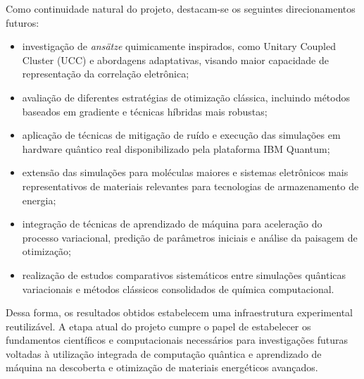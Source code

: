 Como continuidade natural do projeto, destacam-se os seguintes 
direcionamentos futuros:

\begin{itemize}
    \item investigação de \textit{ansätze} quimicamente inspirados, como Unitary Coupled Cluster (UCC) e abordagens adaptativas, visando maior capacidade de representação da correlação eletrônica;
    
    \item avaliação de diferentes estratégias de otimização clássica, incluindo métodos baseados em gradiente e técnicas híbridas mais robustas;
    
    \item aplicação de técnicas de mitigação de ruído e execução das simulações em hardware quântico real disponibilizado pela plataforma IBM Quantum;
    
    \item extensão das simulações para moléculas maiores e sistemas eletrônicos mais representativos de materiais relevantes para tecnologias de armazenamento de energia;
    
    \item integração de técnicas de aprendizado de máquina para aceleração do processo variacional, predição de parâmetros iniciais e análise da paisagem de otimização;
    
    \item realização de estudos comparativos sistemáticos entre simulações quânticas variacionais e métodos clássicos consolidados de química computacional.
\end{itemize}

Dessa forma, os resultados obtidos estabelecem uma infraestrutura 
experimental reutilizável. A etapa atual do projeto cumpre o papel de 
estabelecer os fundamentos científicos e computacionais necessários para 
investigações futuras voltadas à utilização integrada de computação quântica 
e aprendizado de máquina na descoberta e otimização de materiais energéticos 
avançados.
